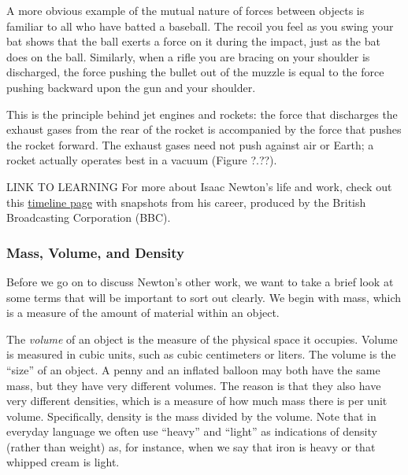\documentclass[main-astronomy.tex]{subfiles}
\begin{document}
\vspace{1em}

A more obvious example of the mutual nature of forces between objects is familiar to all who have batted a baseball. The recoil you feel as you swing your bat shows that the ball exerts a force on it during the impact, just as the bat does on the ball. Similarly, when a rifle you are bracing on your shoulder is discharged, the force pushing the bullet out of the muzzle is equal to the force pushing backward upon the gun and your shoulder.

\vspace{1em}

This is the principle behind jet engines and rockets: the force that discharges the exhaust gases from the rear of the rocket is accompanied by the force that pushes the rocket forward. The exhaust gases need not push against air or Earth; a rocket actually operates best in a vacuum (Figure ?.??).

\begin{gradient}{LINK TO LEARNING}
    For more about Isaac Newton’s life and work, check out this \href{https://openstax.org/l/30IsaacNewTime}{timeline page} with snapshots from his career, produced by the British Broadcasting Corporation (BBC).
\end{gradient}

\subsubsection*{Mass, Volume, and Density}

Before we go on to discuss Newton’s other work, we want to take a brief look at some terms that will be important to sort out clearly. We begin with \gls{mass}, which is a measure of the amount of material within an object.

\vspace{1em}

The \textit{volume} of an object is the measure of the physical space it occupies. Volume is measured in cubic units, such as cubic centimeters or liters. The volume is the ``size'' of an object. A penny and an inflated balloon may both have the same mass, but they have very different volumes. The reason is that they also have very different densities, which is a measure of how much mass there is per unit volume. Specifically, \gls{density} is the mass divided by the volume. Note that in everyday language we often use ``heavy'' and ``light'' as indications of density (rather than weight) as, for instance, when we say that iron is heavy or that whipped cream is light.
\end{document}
